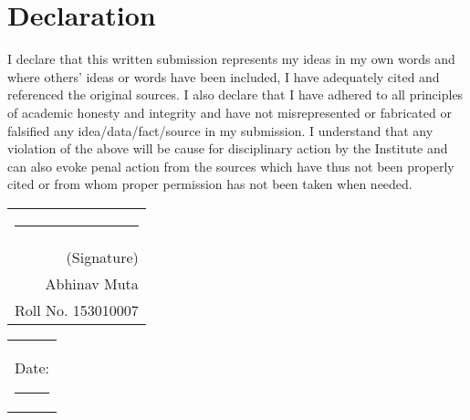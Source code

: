 \section*{\centering Declaration}%
\label{declaration}

I declare that this written submission represents my ideas in my own words and
where others' ideas or words have been included, I have adequately cited and
referenced the original sources. I also declare that I have adhered to all
principles of academic honesty and integrity and have not misrepresented or
fabricated or falsified any idea/data/fact/source in my submission. I understand
that any violation of the above will be cause for disciplinary action by the
Institute and can also evoke penal action from the sources which have thus not
been properly cited or from whom proper permission has not been taken when
needed.

\vspace{3\baselineskip}


\begin{flushright}
\begin{tabular}{@{}r@{}}
  \par\noindent\rule{0.2\textwidth}{0.4pt}\\
  (Signature)\\[0.25\baselineskip]
  Abhinav Muta\\
  Roll No. 153010007
\end{tabular}
\end{flushright}

\begin{flushleft}
\begin{tabular}{@{}c@{}}
  Date:\par\noindent\rule{0.2\textwidth}{0.4pt}\\
\end{tabular}
\end{flushleft}




